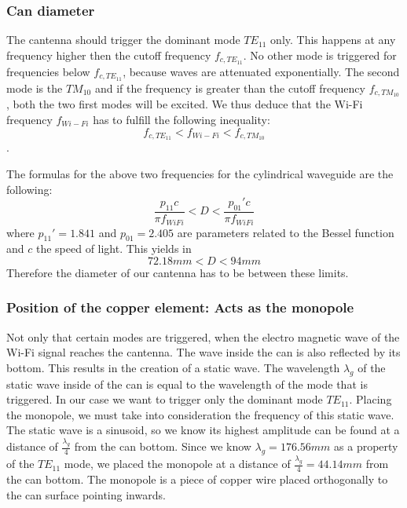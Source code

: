 \documentclass[12pt,a4paper]{article}
\begin{document}
		\subsubsection{Can diameter}
			The cantenna should trigger the dominant mode $TE_{11}$ only. This happens at any frequency higher then the cutoff frequency $f_{c,TE_{11}}$. No other mode is triggered for frequencies below $f_{c,TE_{11}}$, because waves are attenuated exponentially.
			The second mode is the $TM_{10}$ and if the frequency is greater than the cutoff frequency $f_{c,TM_{10}}$, both the two first modes will be excited.
			We thus deduce that the Wi-Fi frequency $f_{Wi-Fi}$ has to fulfill the following inequality:
			\begin{equation}
				f_{c,TE_{11}} < f_{Wi-Fi} < f_{c,TM_{10}}
			\end{equation}.
			
			The formulas for the above two frequencies for the cylindrical waveguide are the following\cite{waveguide}:
			\begin{equation}
				\frac{p_{11} c}{\pi f_{WiFi}} < D < \frac{p_{01}' c}{\pi f_{WiFi}}
			\end{equation}
			where $p_{11}' = 1.841$ and $p_{01}= 2.405$ are parameters related to the Bessel function and $c$ the speed of light.
			This yields in
			\begin{equation}
				72.18mm < D < 94mm
			\end{equation}
			Therefore the diameter of our cantenna has to be between these limits.
			
		\subsubsection{Position of the copper element: Acts as the monopole} \label{mono:pos}
			Not only that certain modes are triggered, when the electro magnetic wave of the Wi-Fi signal reaches the cantenna. The wave inside the can is also reflected by its bottom. This results in the creation of a static wave.
			The wavelength $\lambda_g$ of the static wave inside of the can is equal to the wavelength of the mode that is triggered. In our case we want to trigger only the dominant mode $TE_{11}$.
			Placing the monopole, we must take into consideration the frequency of this static wave.
			The static wave is a sinusoid, so we know its highest amplitude can be found at a distance of $\frac{\lambda_g}{4}$ from the can bottom.
			Since we know $\lambda_g = 176.56 mm$ as a property of the $TE_{11}$ mode\cite{can:lambdag}, we placed the monopole at a distance of $\frac{\lambda_g}{4} = 44.14 mm$ from the can bottom. The monopole is a piece of copper wire placed orthogonally to the can surface pointing inwards.
		
\end{document}
